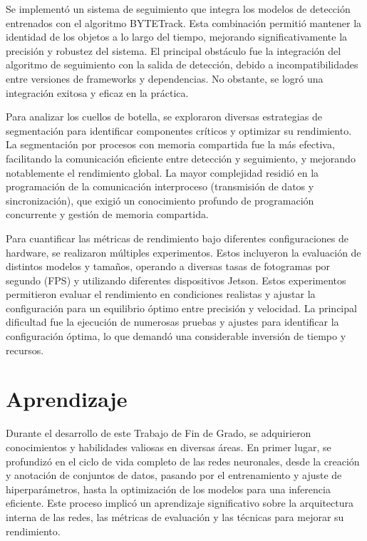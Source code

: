 \documentclass[11pt,spanish,listoffigures,listoftables]{tfgetsinf}
\begin{document}
Se implementó un sistema de seguimiento que integra los modelos de detección entrenados con el algoritmo BYTETrack. Esta combinación permitió mantener la identidad de los objetos a lo largo del tiempo, mejorando significativamente la precisión y robustez del sistema. El principal obstáculo fue la integración del algoritmo de seguimiento con la salida de detección, debido a incompatibilidades entre versiones de frameworks y dependencias. No obstante, se logró una integración exitosa y eficaz en la práctica.

Para analizar los cuellos de botella, se exploraron diversas estrategias de segmentación para identificar componentes críticos y optimizar su rendimiento. La segmentación por procesos con memoria compartida fue la más efectiva, facilitando la comunicación eficiente entre detección y seguimiento, y mejorando notablemente el rendimiento global. La mayor complejidad residió en la programación de la comunicación interproceso (transmisión de datos y sincronización), que exigió un conocimiento profundo de programación concurrente y gestión de memoria compartida.

Para cuantificar las métricas de rendimiento bajo diferentes configuraciones de hardware, se realizaron múltiples experimentos. Estos incluyeron la evaluación de distintos modelos y tamaños, operando a diversas tasas de fotogramas por segundo (FPS) y utilizando diferentes dispositivos Jetson. Estos experimentos permitieron evaluar el rendimiento en condiciones realistas y ajustar la configuración para un equilibrio óptimo entre precisión y velocidad. La principal dificultad fue la ejecución de numerosas pruebas y ajustes para identificar la configuración óptima, lo que demandó una considerable inversión de tiempo y recursos.
\section{Aprendizaje}

Durante el desarrollo de este Trabajo de Fin de Grado, se adquirieron conocimientos y habilidades valiosas en diversas áreas. En primer lugar, se profundizó en el ciclo de vida completo de las redes neuronales, desde la creación y anotación de conjuntos de datos, pasando por el entrenamiento y ajuste de hiperparámetros, hasta la optimización de los modelos para una inferencia eficiente. Este proceso implicó un aprendizaje significativo sobre la arquitectura interna de las redes, las métricas de evaluación y las técnicas para mejorar su rendimiento.
\end{document}
